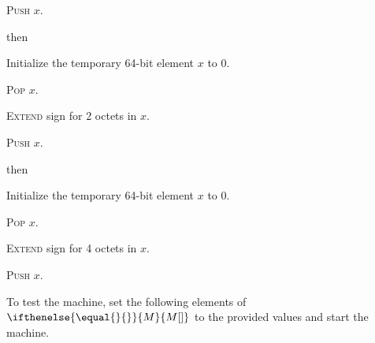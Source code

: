 \documentclass[a4paper,12pt]{article}
\newcommand{\num}[1]{\texttt{#1}}
\newcommand{\hex}[1]{\num{#1}_{\textup{\tiny 16}}}
\newcommand{\MEM}[1]{\ifthenelse{\equal{#1}{}}{M}{M[#1]}}
\newcommand{\proc}[1]{\textsc{#1}}
\newcommand{\op}[1]{$#1$}
\newcommand{\SIGXS}     [1]{\op{\hex{0D}}}
\newcommand{\SIGXI}     [1]{\op{\hex{0E}}}
\begin{document}
\begin{stepnumbers}[start=3]
\begin{description}
\begin{stepnumbers}
    \item \proc{Push} $x$.
    \end{stepnumbers}
  \item[\SIGXS{}] then
    \begin{stepnumbers}
    \item Initialize the temporary 64-bit element $x$ to 0.
    \item \proc{Pop} $x$.
    \item \proc{Extend} sign for 2 octets in $x$.
    \item \proc{Push} $x$.
    \end{stepnumbers}
  \item[\SIGXI{}] then
    \begin{stepnumbers}
    \item Initialize the temporary 64-bit element $x$ to 0.
    \item \proc{Pop} $x$.
    \item \proc{Extend} sign for 4 octets in $x$.
    \item \proc{Push} $x$.
    \end{stepnumbers}
  \end{description}
\end{stepnumbers}
To test the machine, set the following elements of $\MEM{}$ to the provided values and start the machine.
\end{document}
